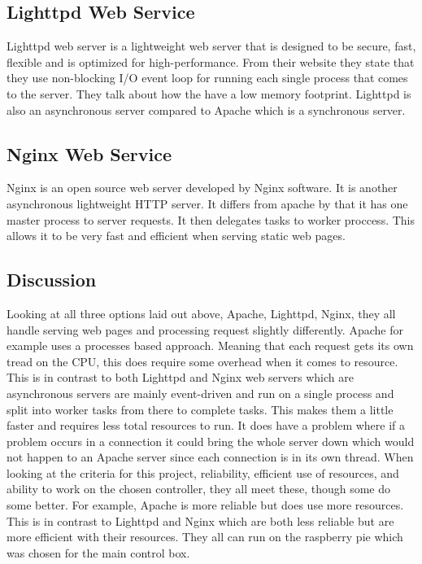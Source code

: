 \documentclass[onecolumn, draftclsnofoot,10pt, compsoc]{IEEEtran}
\begin{document}
		\subsection{Lighttpd Web Service}
		Lighttpd web server is a lightweight web server that is designed to be secure,
		fast, flexible and is optimized for high-performance. From their website \cite[pg 2]{Lighttpd}
		they state that they use non-blocking I/O event loop for running each single
		process that comes to the server. They talk about how the have a low memory
		footprint. Lighttpd is also an asynchronous server compared to Apache which is
		a synchronous server.
		\subsection{Nginx Web Service}
		Nginx is an open source web server developed by Nginx software. It is another
		asynchronous lightweight HTTP server. It differs from apache by that it has
		one master process to server requests. It then delegates tasks to worker
		proccess. This allows it to be very fast and efficient when serving static
		web pages. \cite[pg 2] {Nginx}
		\subsection{Discussion}
		Looking at all three options laid out above, Apache, Lighttpd, Nginx, they all
		handle serving web pages and processing request slightly differently. Apache for
		example uses a processes based approach. Meaning that each request gets its own
		tread on the CPU, this does require some overhead when it comes to resource.
		This is in contrast to both Lighttpd and Nginx web servers which are asynchronous
		servers are mainly event-driven and run on a single process and split into
		worker tasks from there to complete tasks. This makes them a little faster
		and  requires less total resources to run. It does have a problem where if
		a problem occurs in a connection it could bring the whole server down which
		would not happen to an Apache server since each connection is in its own thread.
		When looking at the criteria for this project, reliability, efficient use of
		resources, and ability to work on the chosen controller, they all meet these,
		though some do some better. For example, Apache is more reliable but does
		use more resources. This is in contrast to Lighttpd and Nginx which are both
		less reliable but are more efficient with their resources. They all can run
		on the raspberry pie which was chosen for the main control box.
\end{document}
